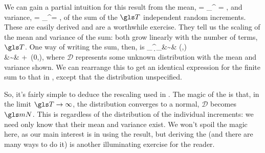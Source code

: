 We can gain a partial intuition for this result from the mean,
\be
{} = \sum_{}^\T \ave{\d\gv_\gtau} = \T \ave{\d\gv},
\ee
and variance,
\be
\var\left[\sum_{\gtau=1}^\T \d\gv_\gtau\right] = \sum_{}^\T \var\left[\d\gv_\gtau\right] = \T \var[\d\gv],
\ee
of the sum of the $\T$ independent random increments. These are easily derived and are a worthwhile exercise. They tell us the scaling of the mean and variance of the sum: both grow linearly with the number of terms, $\T$. One way of writing the sum, then, is
\bea
\sum_{}^\T \d\gv_\gtau &\sim& (\T \ave{\d\gv},\T \var[\d\gv]) \\
&\sim& \T \ave{\d\gv} + \,(0,\var[\d\gv]),
\eea
where $\mathcal{D}$ represents some unknown distribution with the mean and variance shown. We can rearrange this to get an identical expression for the finite sum to that in , except that the distribution unspecified.

So, it's fairly simple to deduce the rescaling used in . The magic of the \CLT is that, in the limit $\T\to\infty$, the distribution converges to a normal, \ie $\mathcal{D}$ becomes $\mN$. This is regardless of the distribution of the individual increments: we need only know that their mean and variance exist. We won't spoil the magic here, as our main interest is in using the result, but deriving the \CLT (and there are many ways to do it) is another illuminating exercise for the reader.

%
%
%

